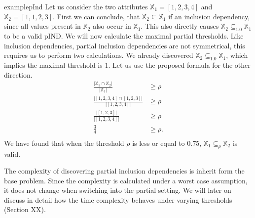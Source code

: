 \begin{restatable}{example}{pInd}\label{exmp:pInd}
    Let us consider the two attributes $\mathbb{X}_1 = [1, 2, 3, 4]$ and $\mathbb{X}_2 = [1, 1, 2, 3]$. First we can conclude, that $\mathbb{X}_2 \subseteq \mathbb{X}_1$ if an inclusion dependency, since all values present in $\mathbb{X}_2$ also occur in $\mathbb{X}_1$. This also directly causes $\mathbb{X}_2 \subseteq_{1.0} \mathbb{X}_1$ to be a valid pIND. We will now calculate the maximal partial thresholds. Like inclusion dependencies, partial inclusion dependencies are not symmetrical, this requires us to perform two calculations. We already discovered $\mathbb{X}_2 \subseteq_{1.0} \mathbb{X}_1$, which implies the maximal threshold is $1$. Let us use the proposed formula for the other direction.
    \begin{align*}
        \frac{|\mathbb{X}_1 \cap \mathbb{X}_2|}
            {|\mathbb{X}_1|} & \geq \rho \\
        \frac{|[1, 2, 3, 4] \cap [1, 2, 3]|}
            {|[1, 2, 3, 4]|} & \geq \rho \\ 
        \frac{|[1, 2, 3]|}
            {|[1, 2, 3, 4]|} & \geq \rho \\
        \frac{3}{4} & \geq \rho. \\ 
    \end{align*}
    We have found that when the threshold $\rho$ is less or equal to $0.75$, $\mathbb{X}_1 \subseteq_{\rho} \mathbb{X}_2$ is valid.
\end{restatable}

The complexity of discovering partial inclusion dependencies is inherit form the base problem. Since the complexity is calculated under a worst case assumption, it does not change when switching into the partial setting. We will later on discuss in detail how the time complexity behaves under varying thresholds (Section XX).  


